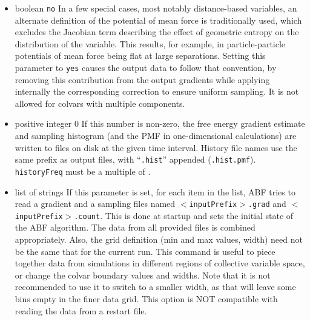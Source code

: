 \begin{itemize}
\item {}
  {boolean}
  {\texttt{no}}
  {In a few special cases, most notably distance-based variables, an alternate definition of
    the potential of mean force is traditionally used, which excludes the Jacobian
    term describing the effect of geometric entropy on the distribution of the variable.
    This results, for example, in particle-particle potentials of mean force being flat
    at large separations.
    Setting this parameter to \texttt{yes} causes the output data to follow that convention,
    by removing this contribution from the output gradients while
    applying internally the corresponding correction to ensure uniform sampling.
    It is not allowed for colvars with multiple components.}

\item {}
  {positive integer}
  {0}
  {If this number is non-zero, the free energy gradient estimate and sampling histogram
    (and the PMF in one-dimensional calculations) are written to files on disk at
    the given time interval. History file names use the same prefix as output files, with
    ``\texttt{.hist}'' appended (\outputName\texttt{.hist.pmf}).
  \texttt{historyFreq} must be a multiple of .}

\item {}
  {list of strings}
  {If this parameter is set, for each item in the list, ABF tries to read
    a gradient and a sampling files named \texttt{$<$inputPrefix$>$.grad}
    and \texttt{$<$inputPrefix$>$.count}. This is done at
    startup and sets the initial state of the ABF algorithm.
    The data from all provided files is combined appropriately.
    Also, the grid definition (min and max values, width) need not be the same
    that for the current run. This command is useful to piece together
    data from simulations in different regions of collective variable space,
    or change the colvar boundary values and widths. Note that it is not
    recommended to use it to switch to a smaller width, as that will leave
    some bins empty in the finer data grid.
    This option is NOT compatible with reading the data from a restart file.}


\end{itemize}
